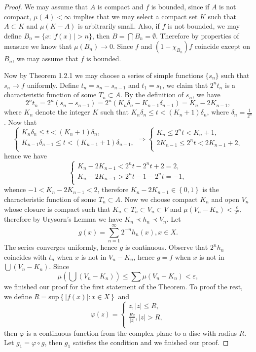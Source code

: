 \begin{proof}
We may assume that $A$ is compact and $f$ is bounded, since if $A$ is not compact, $\mu(A)<\infty$ implies that we may select a compact set $K$ such that $A\subset K$ and $\mu(K-A)$ is arbitrarily small. Also, if $f$ is not bounded, we may define $B_n=\{x:|f(x)|>n\}$, then $B=\bigcap B_n=\emptyset$. Therefore by properties of measure we know that $\mu(B_n)\to 0$. Since $f$ and $(1-\chi_{B_n})f$ coincide except on $B_n$, we may assume that $f$ is bounded.\par
Now by Theorem 1.2.1 we may choose a series of simple functions $\{s_n\}$ such that $s_n\to f$ uniformly. Define $t_n=s_n-s_{n-1}$ and $t_1=s_1$, we claim that $2^nt_n$ is a characteristic function of some $T_n\subset A$. By the definition of $s_n$, we have 
$$
2^nt_n=2^n\left( s_n-s_{n-1} \right) =2^n\left( K_n\delta _n-K_{n-1}\delta _{n-1} \right) =K_n-2K_{n-1},
$$
where $K_n$ denote the integer $K$ such that $K_n\delta _n\le t<\left( K_n+1 \right) \delta _n$, where $\delta_n=\frac{1}{2^n}$. Now that 
$$
\begin{cases}
	K_n\delta _n\le t<\left( K_n+1 \right) \delta _n,\\
	K_{n-1}\delta _{n-1}\le t<\left( K_{n-1}+1 \right) \delta _{n-1},\\
\end{cases}\Rightarrow \begin{cases}
	K_n\le 2^nt<K_n+1,\\
	2K_{n-1}\le 2^nt<2K_{n-1}+2,\\
\end{cases}
$$
hence we have 
$$
\begin{cases}
	K_n-2K_{n-1}<2^nt-2^nt+2=2,\\
	K_n-2K_{n-1}>2^nt-1-2^nt=-1,\\
\end{cases}
$$
whence 
$-1<K_n-2K_{n-1}<2$, therefore $K_n-2K_{n-1}\in \left\{ 0,1 \right\} $ is the characteristic function of some $T_n\subset A$. Now we choose compact $K_n$ and open $V_n$ whose closure is compact such that $K_n\subset T_n\subset V_n\subset V$ and $\mu(V_n-K_n)<\frac{\varepsilon}{2^n}$, therefore by Urysorn's Lemma we have $K_n\prec h_n\prec V_n$. Let 
$$
g\left( x \right) =\sum_{n=1}^{\infty}{2^{-n}h_n\left( x \right)},x\in X.
$$
The series converges uniformly, hence $g$ is continuous. Observe that $2^nh_n$ coincides with $t_n$ when $x$ is not in $V_n-K_n$, hence $g=f$ when $x$ is not in $\bigcup(V_n-K_n)$. Since 
$$
\mu \left( \bigcup{\left( V_n-K_n \right)} \right) \le \sum{\mu \left( V_n-K_n \right)}<\varepsilon ,
$$
we finished our proof for the first statement of the Theorem. To proof the rest, we define $R=\mathrm{sup}\left\{ \left| f\left( x \right) \right|:x\in X \right\} $ and 
$$
\varphi \left( z \right) =\begin{cases}
	z,\left| z \right|\le R,\\
	\frac{Rz}{\left| z \right|},\left| z \right|>R,\\
\end{cases}
$$
then $\varphi$ is a continuous function from the complex plane to a disc with radius $R$. Let $g_1=\varphi\circ g$, then $g_1$ satisfies the condition and we finished our proof.
\end{proof}
